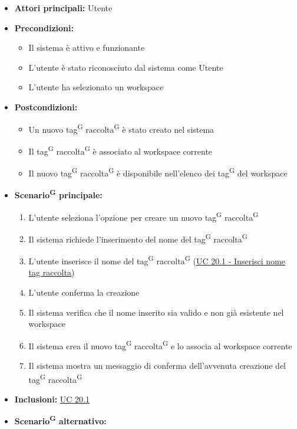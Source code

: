 \documentclass[a4paper, 11pt]{article}
\begin{document}
\begin{itemize}
	\item \textbf{Attori principali:} Utente
	\item \textbf{Precondizioni:}
	\begin{itemize}
		\item Il sistema è attivo e funzionante
		\item L'utente è stato riconosciuto dal sistema come Utente
		\item L'utente ha selezionato un workspace
	\end{itemize}
	\item \textbf{Postcondizioni:}
	\begin{itemize}
		\item Un nuovo tag\textsuperscript{G} raccolta\textsuperscript{G} è stato creato nel sistema
		\item Il tag\textsuperscript{G} raccolta\textsuperscript{G} è associato al workspace corrente
		\item Il nuovo tag\textsuperscript{G} raccolta\textsuperscript{G} è disponibile nell'elenco dei tag\textsuperscript{G} del workspace
	\end{itemize}
	\item \textbf{Scenario\textsuperscript{G} principale:}
	\begin{enumerate}
		\item L'utente seleziona l'opzione per creare un nuovo tag\textsuperscript{G} raccolta\textsuperscript{G}
		\item Il sistema richiede l'inserimento del nome del tag\textsuperscript{G} raccolta\textsuperscript{G}
		\item L'utente inserisce il nome del tag\textsuperscript{G} raccolta\textsuperscript{G} (\hyperref[UC20.1]{UC 20.1 - Inserisci nome tag raccolta})
		\item L'utente conferma la creazione
		\item Il sistema verifica che il nome inserito sia valido e non già esistente nel workspace
		\item Il sistema crea il nuovo tag\textsuperscript{G} raccolta\textsuperscript{G} e lo associa al workspace corrente
		\item Il sistema mostra un messaggio di conferma dell'avvenuta creazione del tag\textsuperscript{G} raccolta\textsuperscript{G}
	\end{enumerate}
	\item \textbf{Inclusioni:} \hyperref[UC20.1]{UC 20.1}
		\item \textbf{Scenario\textsuperscript{G} alternativo:}

\end{itemize}
\end{document}
